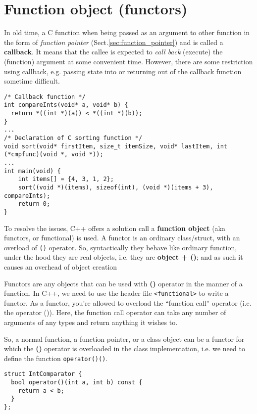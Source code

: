 \section{Function object (functors)}
\label{sec:functor}
\label{sec:function-object}

In old time, a C function when being passed as an argument to other function in
the form of {\it function pointer} (Sect.\ref{sec:function_pointer}) and is
called a {\bf callback}.
It means that the callee is expected to {\it call back} (execute) the (function) argument at some
convenient time. However, there are some restriction using callback, e.g.
passing state into or returning out of the callback function sometime difficult.

\begin{verbatim}
/* Callback function */
int compareInts(void* a, void* b) {
  return *((int *)(a)) < *((int *)(b));
}
...
/* Declaration of C sorting function */
void sort(void* firstItem, size_t itemSize, void* lastItem, int (*cmpfunc)(void *, void *));
...
int main(void) {
    int items[] = {4, 3, 1, 2};
    sort((void *)(items), sizeof(int), (void *)(items + 3), compareInts);
    return 0;
}
\end{verbatim}

To resolve the issues, C++ offers a solution call a {\bf function object} (aka
functors, or functional) is used. A functor is an ordinary class/struct, with an
overload of \verb!()! operator. So, syntactically they behave like ordinary
function, under the hood they are  real objects, i.e. they are {\bf object +
()}; and as such it causes an overhead of object creation

Functors are any objects that can be used with {\bf ()} operator in the manner
of a function. In C++, we need to use the header file \verb!<functional>! to
write a functor. As a functor, you're allowed to
overload the ``function call'' operator (i.e. the operator ()). Here, the
function call operator can take any number of arguments of any types and return
anything it wishes to.


So, a normal function, a function pointer, or a class object can be a functor
for which the {\bf ()} operator is overloaded in the class implementation, i.e.
we need to define the function \verb!operator()()!.
\begin{verbatim}
struct IntComparator {
  bool operator()(int a, int b) const {
    return a < b;
  }
};
\end{verbatim}



